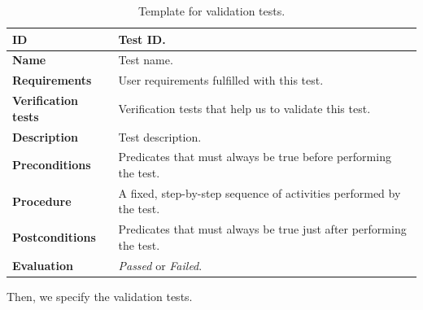 \begin{center}
\begin{table}[htb]
\centering
\begin{tabular}{@{}p{2.5cm} p{9cm}@{}} 
\toprule
\textbf{ID} 					& Test ID. \\
\midrule
\textbf{Name} 				& Test name. \\
\midrule
\textbf{Requirements} 		& User requirements fulfilled with this test. \\
\midrule
\textbf{Verification tests} 	& Verification tests that help us to validate this test. \\
\midrule
\textbf{Description} 		& Test description. \\
\midrule
\textbf{Preconditions}		& Predicates that must always be true before performing the test. \\
\midrule
\textbf{Procedure}			& A fixed, step-by-step sequence of activities performed by the test. \\
\midrule
\textbf{Postconditions} 		& Predicates that must always be true just after performing the test. \\
\midrule
\textbf{Evaluation} 			& \textit{Passed} or \textit{Failed}. \\
\bottomrule
\end{tabular}
\caption{Template for validation tests.}
\label{tab:validation_tests}
\end{table}
\end{center}


Then, we specify the validation tests.


